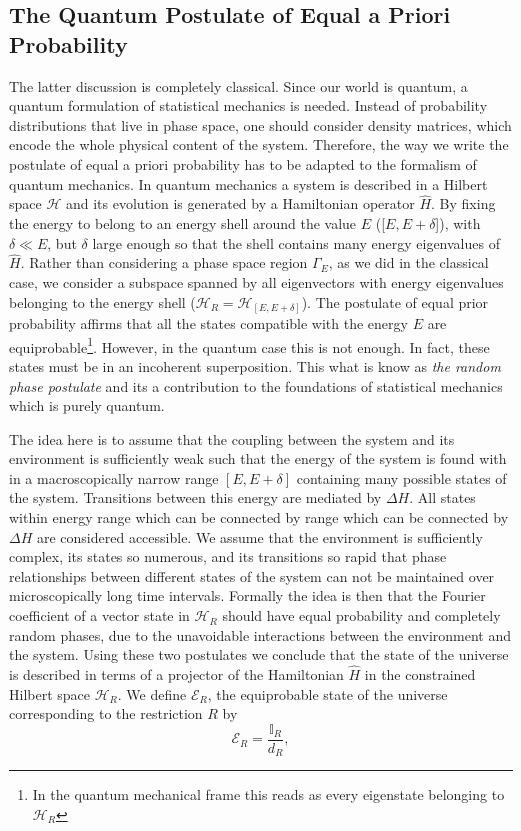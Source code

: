\subsection{The Quantum Postulate of Equal a Priori Probability}
The latter discussion is completely classical. Since our world is quantum, a quantum formulation of statistical mechanics is needed. Instead of probability distributions that live in phase space, one should consider density matrices, which encode the whole physical content of the system. Therefore, the way we write the postulate of equal a priori probability has to be adapted to the formalism of quantum mechanics.
\newline
In quantum mechanics a system is described in a Hilbert space $\mathcal{H}$ and its evolution is generated by a Hamiltonian operator $\hat{H}$. By fixing the energy to belong to an energy shell around the value $E$ ([$E,E+\delta$]), with $\delta\ll E$, but $\delta$ large enough so that the shell contains many energy eigenvalues of $\hat{H}$. Rather than considering a phase space region $\Gamma_{E}$, as we did in the classical case, we consider a subspace spanned by all eigenvectors with energy eigenvalues belonging to the energy shell ($\mathcal{H}_{R}=\mathcal{H}_{[E,E+\delta]}$).
\newline
The postulate of equal prior probability affirms that all the states compatible with the energy $E$ are equiprobable\footnote{In the quantum mechanical frame this reads as every eigenstate belonging to $\mathcal{H}_R$}. However, in the quantum case this is not enough. In fact, these states must be in an incoherent superposition. This what is know as  \textit{the random phase postulate} and its a contribution to the foundations of statistical mechanics which is purely quantum. 

The idea here is to assume that the coupling between the system and its environment is sufficiently weak such that the energy of the system is found with in a macroscopically narrow range $[E,E+\delta]$ containing many possible states of the system. Transitions between this energy are mediated by $\Delta H$. All states within energy range which can be connected by range which can be connected by $\Delta H$ are considered accessible. We assume that the environment is sufficiently complex, its states so numerous, and its transitions so rapid that phase relationships between different states of the system can not be maintained over microscopically long time intervals. Formally the idea is then that the Fourier coefficient of a vector state in $\mathcal{H}_{R}$ should have equal probability and completely random phases, due to the unavoidable interactions between the environment and the system\cite{huang_statistical_1987}.
\newline
Using these two postulates we conclude that the state of the universe is described in terms of a projector of the Hamiltonian $\hat{H}$ in the constrained Hilbert space $\mathcal{H}_R$. We define $\mathcal{E}_{R}$, the equiprobable state of the universe corresponding to the restriction $R$ by
\begin{equation}
\mathcal{E}_R = \frac{\mathbb{I}_{R}}{d_R},
\label{CH1:equiprobable_state}
\end{equation}

